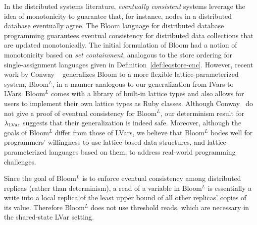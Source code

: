 %
In the distributed systems literature, \emph{eventually
  consistent} systems \cite{eventual-consistency} 
leverage the idea of monotonicity to guarantee that,
for instance, nodes in a distributed database eventually agree.
The Bloom language for distributed database programming \cite{bloom-cidr} guarantees eventual consistency for
distributed data collections that are updated monotonically.
The initial formulation of Bloom 
had a notion of monotonicity based on \emph{set containment},
analogous to the store ordering for single-assignment languages given in 
Definition~\ref{def:leqstore-cnc}.
However, recent work
by Conway \etal~\cite{blooml} generalizes Bloom to a more flexible
lattice-parameterized system, Bloom$^L$, in a manner analogous
to our generalization from IVars to LVars.
Bloom$^L$ comes with a library of built-in lattice types and also
allows for users to implement their own lattice types as Ruby classes.
Although Conway \etal~do not give a proof of eventual consistency for
Bloom$^L$, our determinism result for $\lambda_{\textrm{LVar}}$ suggests that
their generalization is indeed safe.
Moreover, although the goals of Bloom$^L$
differ from those of LVars, we believe that Bloom$^L$ bodes well for
programmers' willingness to use lattice-based data structures,
and lattice-parameterized languages based on them, to address
real-world programming challenges.

Since the goal of Bloom$^L$ is to enforce eventual consistency among
distributed replicas (rather than determinism), a read of a variable
in Bloom$^L$ is essentially a write into a local replica of the least
upper bound of all other replicas' copies of its value.  Therefore
Bloom$^L$ does not use threshold reads, which are necessary in the
shared-state LVar setting.
\fi{}

